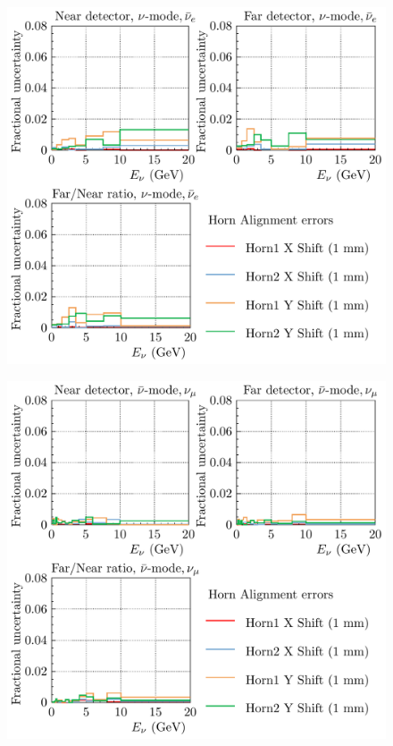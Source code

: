 \documentclass{article}
\begin{document}
\begin{figure}
  \includegraphics[width=\textwidth]{plots/fracerrs/numode_nuebar_HornAlignment}
  \caption{}
  \label{fig:hornalign_nu_nuebar}
\end{figure}

\begin{figure}
  \includegraphics[width=\textwidth]{plots/fracerrs/nubarmode_numu_HornAlignment}
  \caption{}
  \label{fig:hornalign_nubar_numu}
\end{figure}
\end{document}
